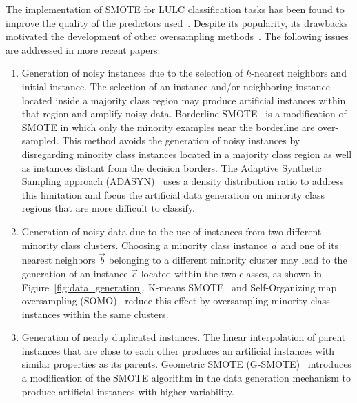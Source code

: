 \documentclass[preprint,12pt]{elsarticle}
\begin{document}
The implementation of SMOTE for LULC classification tasks has been found to
improve the quality of the predictors used~\cite{Jozdani2019,Bogner2018}.
Despite its popularity, its drawbacks motivated the development of other
oversampling methods~\cite{Douzas2019}. The following issues are addressed in
more recent papers:

\begin{enumerate}
    \item Generation of noisy instances due to the selection of $k$-nearest
        neighbors and initial instance. The selection of an instance and/or
        neighboring instance located inside a majority class region may
        produce artificial instances within that region and amplify noisy
        data.  Borderline-SMOTE~\cite{Han2005} is a modification of SMOTE in
        which only the minority examples near the borderline are over-sampled.
        This method avoids the generation of noisy instances by disregarding
        minority class instances located in a majority class region as well as
        instances distant from the decision borders. The Adaptive Synthetic
        Sampling approach (ADASYN)~\cite{HaiboHe2008} uses a density
        distribution ratio to address this limitation and focus the artificial
        data generation on minority class regions that are more difficult to
        classify.
    \item Generation of noisy data due to the use of instances from two
        different minority class clusters. Choosing a minority class instance
        $\overrightarrow{a}$ and one of its nearest neighbors
        $\overrightarrow{b}$ belonging to a different minority cluster may
        lead to the generation of an instance $\overrightarrow{c}$ located
        within the two classes, as shown in Figure~\ref{fig:data_generation}.
        K-means SMOTE~\cite{Douzas2018} and Self-Organizing map oversampling
        (SOMO)~\cite{Douzas2017} reduce this effect by oversampling minority
        class instances within the same clusters.
    \item Generation of nearly duplicated instances. The linear interpolation
        of parent instances that are close to each other produces an artificial
        instances with similar properties as its parents. Geometric SMOTE
        (G-SMOTE)~\cite{Douzas2019} introduces a modification of the SMOTE
        algorithm in the data generation mechanism to produce artificial
        instances with higher variability.
\end{enumerate}
\end{document}
